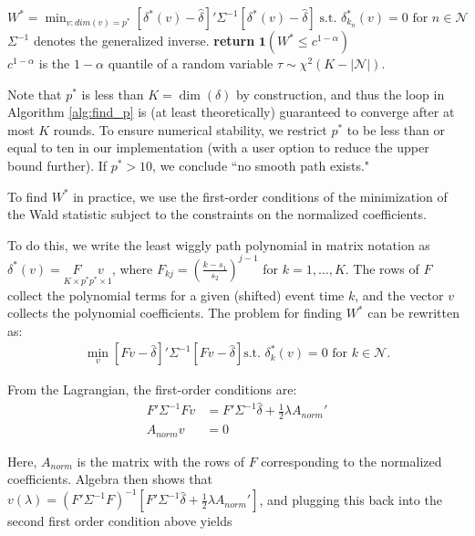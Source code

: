 \documentclass[12pt]{article}
\begin{document}
\begin{algorithm*}
\begin{algorithmic}
\State $W^*=\min_{v:dim(v)=p^*} [\delta^*(v)-\widehat{\delta}]'\Sigma^{-1}[\delta^*(v)-\widehat{\delta}] \; \text{s.t. } \delta_{k_n}^*(v)=0 \text{ for } n \in \mathcal{N}$\\
\Comment $\Sigma^{-1}$ denotes the generalized inverse.
\State \textbf{return} $\textbf{1}(W^* \le c^{1-\alpha})$\\
\Comment $c^{1-\alpha}$ is the $1-\alpha$ quantile of a random variable $\tau \sim \chi^2(K-|\mathcal{N}|)$.
\EndFunction
\end{algorithmic}
\end{algorithm*}

Note that $p^*$ is less than $K=\dim(\delta)$ by construction, and thus the loop in Algorithm \ref{alg:find_p} is (at least theoretically) guaranteed to converge after at most $K$ rounds.
To ensure numerical stability, we restrict $p^*$ to be less than or equal to ten in our implementation (with a user option to reduce the upper bound further).
If $p^{*}>10$, we conclude ``no smooth path exists."

To find $W^*$ in practice, we use the first-order conditions of the minimization of the Wald statistic subject to the constraints on the normalized coefficients.

To do this, we write the least wiggly path polynomial in matrix notation as $\delta^*(v) = \underset{K\times p^*}{F} \underset{p^* \times 1}{v} $, where $F_{kj} = \left(\frac{k-s_1}{s_2}\right)^{j-1}$ for $k=1, \ldots, K$.
The rows of $F$ collect the polynomial terms for a given (shifted) event time $k$, and the vector $v$ collects the polynomial coefficients.
The problem for finding $W^*$ can be rewritten as:
\begin{align}
\min_v \left[Fv-\widehat{\delta}\right]'\Sigma^{-1}\left[Fv-\widehat{\delta}\right] \text{s.t. } \delta_{k}^*(v)=0 \text{ for } k \in \mathcal{N}. \label{eq:optimization_W*}
\end{align}

From the Lagrangian, the first-order conditions are:
\begin{align*}
F'\Sigma^{-1}F v &=  F' \Sigma^{-1} \widehat{\delta} +\frac{1}{2} \lambda A_{norm}'\\
A_{norm} v &= 0
\end{align*}

Here, $A_{norm}$ is the matrix with the rows of $F$ corresponding to the normalized coefficients.
Algebra then shows that $v(\lambda)=(F'\Sigma^{-1}F)^{-1}[F' \Sigma^{-1} \widehat{\delta} + \frac{1}{2} \lambda A_{norm}']$, and plugging this back into the second first order condition above yields
\end{document}
